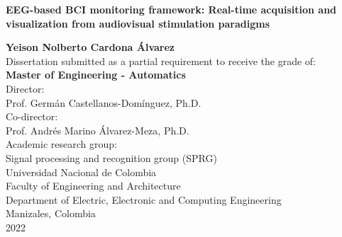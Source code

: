 \begin{center}

    \thispagestyle{empty} 
    \vspace*{2cm} 
    
    \begin{spacing}{1.9} 
        \textbf{\huge EEG-based BCI monitoring framework: Real-time acquisition and visualization from audiovisual stimulation paradigms}\\[1.0cm]
    \end{spacing}

    \Large
        \textbf{Yeison Nolberto Cardona Álvarez}\\[2.0cm]
    
    \small 
        Dissertation submitted as a partial requirement to receive the grade of:\\
        \textbf{Master of Engineering - Automatics}\\[1cm]
        
        Director:\\
        Prof. Germán Castellanos-Domínguez, Ph.D.\\[0.25cm]
        
        Co-director:\\
        Prof. Andrés Marino Álvarez-Meza, Ph.D.\\[1cm]
        
        Academic research group:\\
        Signal processing and recognition group (SPRG)\\[1cm]
        
        Universidad Nacional de Colombia\\
        Faculty of Engineering and Architecture\\ 
        Department of Electric, Electronic and Computing Engineering\\
        Manizales, Colombia\\
        2022\\

\end{center}

\newpage{\pagestyle{empty}\cleardoublepage}
\newpage

